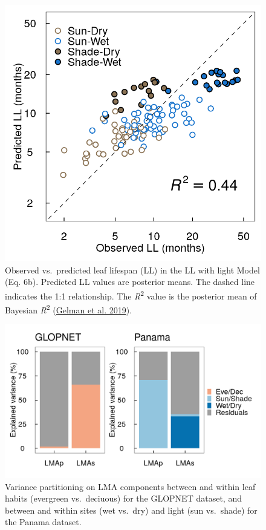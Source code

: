 \documentclass[
  12pt,
  a4paper,
,tablecaptionabove
]{scrartcl}
\begin{document}
\begin{figure}
\hypertarget{fig:LLplt}{%
\centering
\includegraphics{../figs/pa_point_ll.png}
\caption{Observed vs.~predicted leaf lifespan (LL) in the LL with light Model (Eq. 6b).
Predicted LL values are posterior means.
The dashed line indicates the 1:1 relationship.
The \emph{R}\textsuperscript{2} value is the posterior mean of Bayesian \emph{R}\textsuperscript{2} (\protect\hyperlink{ref-Gelman2019}{Gelman et al. 2019}).}\label{fig:LLplt}
}
\end{figure}

\newpage

\begin{figure}
\hypertarget{fig:vpart}{%
\centering
\includegraphics{../figs/vpart.png}
\caption{Variance partitioning on LMA components between and within leaf habits (evergreen vs.~deciuous) for the GLOPNET dataset, and between and within sites (wet vs.~dry) and light (sun vs.~shade) for the Panama dataset.}\label{fig:vpart}
}
\end{figure}
\end{document}
